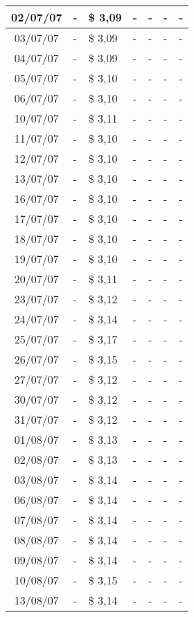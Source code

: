\begin{center}
\begin{longtable}{|c|p{1.5cm}|p{1.5cm}|p{1.5cm}|p{1.5cm}|p{1.5cm}|p{1.5cm}|}
02/07/07 & - & \$ 3,09 & - & - & - & - \\ \hline
03/07/07 & - & \$ 3,09 & - & - & - & - \\ \hline
04/07/07 & - & \$ 3,09 & - & - & - & - \\ \hline
05/07/07 & - & \$ 3,10 & - & - & - & - \\ \hline
06/07/07 & - & \$ 3,10 & - & - & - & - \\ \hline
10/07/07 & - & \$ 3,11 & - & - & - & - \\ \hline
11/07/07 & - & \$ 3,10 & - & - & - & - \\ \hline
12/07/07 & - & \$ 3,10 & - & - & - & - \\ \hline
13/07/07 & - & \$ 3,10 & - & - & - & - \\ \hline
16/07/07 & - & \$ 3,10 & - & - & - & - \\ \hline
17/07/07 & - & \$ 3,10 & - & - & - & - \\ \hline
18/07/07 & - & \$ 3,10 & - & - & - & - \\ \hline
19/07/07 & - & \$ 3,10 & - & - & - & - \\ \hline
20/07/07 & - & \$ 3,11 & - & - & - & - \\ \hline
23/07/07 & - & \$ 3,12 & - & - & - & - \\ \hline
24/07/07 & - & \$ 3,14 & - & - & - & - \\ \hline
25/07/07 & - & \$ 3,17 & - & - & - & - \\ \hline
26/07/07 & - & \$ 3,15 & - & - & - & - \\ \hline
27/07/07 & - & \$ 3,12 & - & - & - & - \\ \hline
30/07/07 & - & \$ 3,12 & - & - & - & - \\ \hline
31/07/07 & - & \$ 3,12 & - & - & - & - \\ \hline
01/08/07 & - & \$ 3,13 & - & - & - & - \\ \hline
02/08/07 & - & \$ 3,13 & - & - & - & - \\ \hline
03/08/07 & - & \$ 3,14 & - & - & - & - \\ \hline
06/08/07 & - & \$ 3,14 & - & - & - & - \\ \hline
07/08/07 & - & \$ 3,14 & - & - & - & - \\ \hline
08/08/07 & - & \$ 3,14 & - & - & - & - \\ \hline
09/08/07 & - & \$ 3,14 & - & - & - & - \\ \hline
10/08/07 & - & \$ 3,15 & - & - & - & - \\ \hline
13/08/07 & - & \$ 3,14 & - & - & - & - \\ \hline

\end{longtable}
\end{center}
